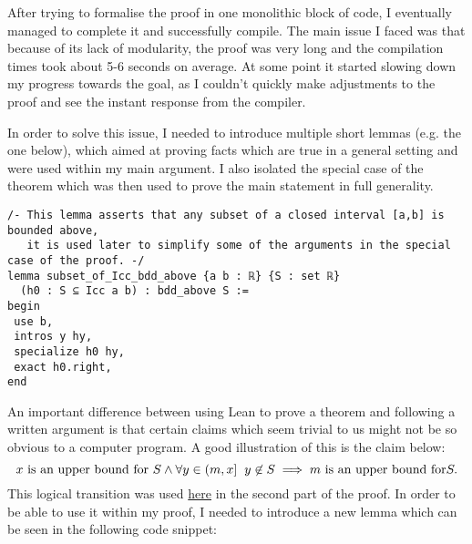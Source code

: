 \documentclass[11pt]{article}
\begin{document}
After trying to formalise the proof in one monolithic block of code, I eventually
managed to complete it and successfully compile. The main issue I faced was
that because of its lack of modularity, the proof was very long and the
compilation times took about 5-6 seconds on average. At some point it
started slowing down my progress towards the goal, as I couldn't quickly make
adjustments to the proof and see the instant response from the compiler.

In order to solve this issue, I needed to introduce multiple short lemmas (e.g. the one below), which
aimed at proving facts which are true in a general setting and were used within
my main argument. I also isolated the special case of the theorem which was then
used to prove the main statement in full generality.

\begin{verbatim}
/- This lemma asserts that any subset of a closed interval [a,b] is bounded above,
   it is used later to simplify some of the arguments in the special case of the proof. -/
lemma subset_of_Icc_bdd_above {a b : ℝ} {S : set ℝ}
  (h0 : S ⊆ Icc a b) : bdd_above S :=
begin
 use b,
 intros y hy,
 specialize h0 hy,
 exact h0.right,
end
\end{verbatim}

An important difference between using Lean to prove a theorem and following a
written argument is that certain claims which seem trivial to us might not be so
obvious to a computer program. A good illustration of this is the claim below:
\[
  x \text{ is an upper bound for } S \land \forall y \in (m, x] \hspace{0.2cm} y \not\in S \implies m \text{ is an upper bound for} S
.\]
This logical transition was used \hyperlink{upper_bound}{here} in the
second part of the proof. In order to be able to use it within my proof, I
needed to introduce a new lemma which can be seen in the following code snippet:
\end{document}
